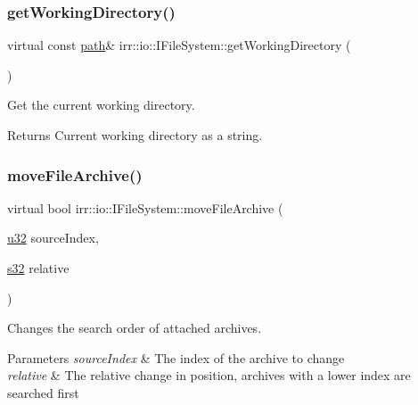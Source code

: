 \subsubsection{\texorpdfstring{get\+Working\+Directory()}{getWorkingDirectory()}}
{\footnotesize\ttfamily virtual const \hyperlink{namespaceirr_1_1io_ab1bdc45edb3f94d8319c02bc0f840ee1}{path}\& irr\+::io\+::\+I\+File\+System\+::get\+Working\+Directory (\begin{DoxyParamCaption}{ }\end{DoxyParamCaption})\hspace{0.3cm}{\ttfamily [pure virtual]}}



Get the current working directory. 

\begin{DoxyReturn}{Returns}
Current working directory as a string. 
\end{DoxyReturn}
\mbox{\label{classirr_1_1io_1_1IFileSystem_ae8530fb9793373cf4dbee956090e99f6}} 
\subsubsection{\texorpdfstring{move\+File\+Archive()}{moveFileArchive()}}
{\footnotesize\ttfamily virtual bool irr\+::io\+::\+I\+File\+System\+::move\+File\+Archive (\begin{DoxyParamCaption}\item[{\hyperlink{namespaceirr_a0416a53257075833e7002efd0a18e804}{u32}}]{source\+Index,  }\item[{\hyperlink{namespaceirr_ac66849b7a6ed16e30ebede579f9b47c6}{s32}}]{relative }\end{DoxyParamCaption})\hspace{0.3cm}{\ttfamily [pure virtual]}}



Changes the search order of attached archives. 


\begin{DoxyParams}{Parameters}
{\em source\+Index} & The index of the archive to change \\
\hline
{\em relative} & The relative change in position, archives with a lower index are searched first \\
\hline
\end{DoxyParams}
\mbox{\label{classirr_1_1io_1_1IFileSystem_aa509623756c9bcbc3a9bcf455ea2a3ba}} 
